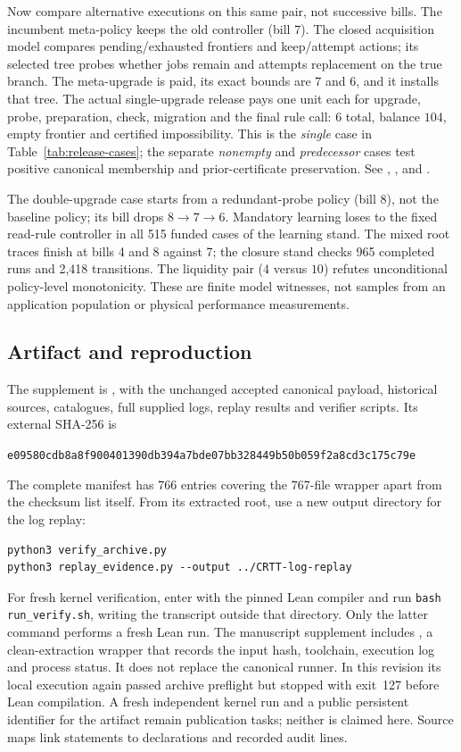 Now compare alternative executions on this same pair, not successive bills. The incumbent meta-policy keeps the old controller (bill $7$). The closed acquisition model compares pending/exhausted frontiers and keep/attempt actions; its selected tree probes whether jobs remain and attempts replacement on the true branch. The meta-upgrade is paid, its exact bounds are $7$ and $6$, and it installs that tree. The actual single-upgrade release pays one unit each for upgrade, probe, preparation, check, migration and the final rule call: $6$ total, balance $104$, empty frontier and certified impossibility. This is the \emph{single} case in Table~\ref{tab:release-cases}; the separate \emph{nonempty} and \emph{predecessor} cases test positive canonical membership and prior-certificate preservation. See , , and .

The double-upgrade case starts from a redundant-probe policy (bill $8$), not the baseline policy; its bill drops $8\to7\to6$. Mandatory learning loses to the fixed read-rule controller in all 515 funded cases of the learning stand. The mixed root traces finish at bills 4 and 8 against 7; the closure stand checks 965 completed runs and 2,418 transitions. The liquidity pair ($4$ versus $10$) refutes unconditional policy-level monotonicity. These are finite model witnesses, not samples from an application population or physical performance measurements.

\newpage
\subsection{Artifact and reproduction}\label{sec:artifact}
The supplement is  \cite{crttartifact}, with the unchanged accepted canonical payload, historical sources, catalogues, full supplied logs, replay results and verifier scripts. Its external SHA-256 is
\begin{center}\small\texttt{e09580cdb8a8f900401390db394a7bde07bb328449b50b059f2a8cd3c175c79e}\end{center}
The complete manifest has 766 entries covering the 767-file wrapper apart from the checksum list itself. From its extracted root, use a new output directory for the log replay:
\begin{verbatim}
python3 verify_archive.py
python3 replay_evidence.py --output ../CRTT-log-replay
\end{verbatim}
For fresh kernel verification, enter  with the pinned Lean compiler and run \verb|bash run_verify.sh|, writing the transcript outside that directory. Only the latter command performs a fresh Lean run. The manuscript supplement includes , a clean-extraction wrapper that records the input hash, toolchain, execution log and process status. It does not replace the canonical runner. In this revision its local execution again passed archive preflight but stopped with exit~127 before Lean compilation. A fresh independent kernel run and a public persistent identifier for the artifact remain publication tasks; neither is claimed here. Source maps link statements to declarations and recorded audit lines.
